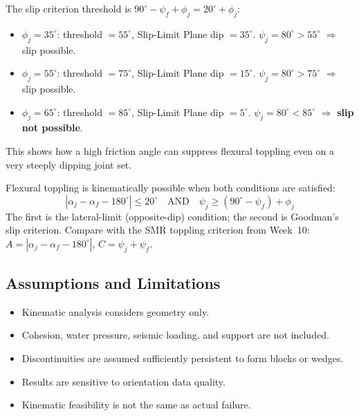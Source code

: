 \documentclass[a4paper,12pt]{article}
\begin{document}
\begin{notebox}[title={Lecture worked example: Joint $80^\circ/040^\circ$, slope $70^\circ/220^\circ$}]
The slip criterion threshold is $90^\circ - \psi_f + \phi_j = 20^\circ + \phi_j$:

\begin{itemize}[nosep]
    \item $\phi_j = 35^\circ$: threshold $=55^\circ$, Slip-Limit Plane dip $=35^\circ$. $\psi_j = 80^\circ > 55^\circ$ $\Rightarrow$ slip possible.
    \item $\phi_j = 55^\circ$: threshold $=75^\circ$, Slip-Limit Plane dip $=15^\circ$. $\psi_j = 80^\circ > 75^\circ$ $\Rightarrow$ slip possible.
    \item $\phi_j = 65^\circ$: threshold $=85^\circ$, Slip-Limit Plane dip $=5^\circ$. $\psi_j = 80^\circ < 85^\circ$ $\Rightarrow$ \textbf{slip not possible}.
\end{itemize}
\vspace{1.0 em}
This shows how a high friction angle can suppress flexural toppling even on a very steeply dipping joint set.
\end{notebox}

\begin{warnbox}
Flexural toppling is kinematically possible when both conditions are satisfied:
\[
|\alpha_j - \alpha_f - 180^\circ| \leq 20^\circ \quad \text{AND} \quad \psi_j \geq (90^\circ - \psi_f) + \phi_j
\]
The first is the lateral-limit (opposite-dip) condition; the second is Goodman's slip criterion. Compare with the SMR toppling criterion from Week~10: $A = |\alpha_j - \alpha_f - 180^\circ|$, $C = \psi_j + \psi_f$.
\end{warnbox}

\subsection{Assumptions and Limitations}

\begin{itemize}
    \item Kinematic analysis considers geometry only.
    \item Cohesion, water pressure, seismic loading, and support are not included.
    \item Discontinuities are assumed sufficiently persistent to form blocks or wedges.
    \item Results are sensitive to orientation data quality.
    \item Kinematic feasibility is not the same as actual failure.
\end{itemize}
\end{document}
